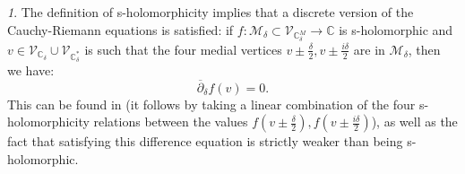 \documentclass[oneside,english]{amsart}
\numberwithin{equation}{section}
\numberwithin{figure}{section}
\theoremstyle{plain}
\theoremstyle{plain}
\theoremstyle{plain}
\theoremstyle{plain}
\theoremstyle{plain}
\theoremstyle{definition}
\theoremstyle{remark}
\newtheorem{rem}[thm]{\protect\remarkname}
\providecommand{\remarkname}{Remark}
\begin{document}
\begin{rem}
The definition of s-holomorphicity implies that a discrete version
of the Cauchy-Riemann equations is satisfied: if $f:\mathcal{M}_{\delta}\subset\mathcal{V}_{\mathbb{C}_{\delta}^{M}}\to\mathbb{C}$
is s-holomorphic and $v\in\mathcal{V}_{\mathbb{C}_{\delta}}\cup\mathcal{V}_{\mathbb{C}_{\delta}^{*}}$
is such that the four medial vertices $v\pm\frac{\delta}{2},v\pm\frac{i\delta}{2}$
are in $\mathcal{M}_{\delta}$, then we have: 
\[
\overline{\partial}_{\delta}f\left(v\right)=0.
\]
This can be found in \cite{smirnov-ii} (it follows by taking a linear
combination of the four s-holomorphicity relations between the values
$f\left(v\pm\frac{\delta}{2}\right),f\left(v\pm\frac{i\delta}{2}\right)$),
as well as the fact that satisfying this difference equation is strictly
weaker than being s-holomorphic. 
\end{rem}
\end{document}
